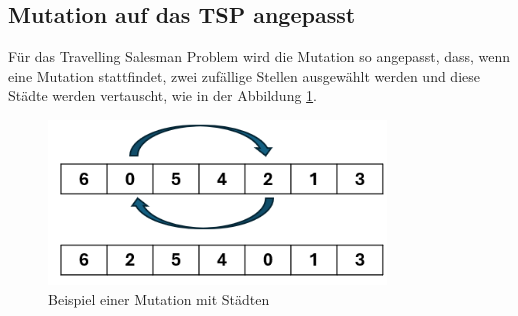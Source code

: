 \subsection{Mutation auf das TSP angepasst
\label{buch:paper:varalg:subsection:mutation_tsp}}
Für das Travelling Salesman Problem wird die Mutation so angepasst,
dass, wenn eine Mutation stattfindet, zwei zufällige Stellen ausgewählt
werden und diese Städte werden vertauscht, 
wie in der Abbildung \ref{fig:mutation_genetic_string_cities}.
\begin{figure}
	\centering
	\includegraphics[width=0.8\textwidth]{
        papers/varalg/images/teil3/09GeneticStringCitiesMutation.png
        }
	\caption{Beispiel einer Mutation mit Städten}
	\label{fig:mutation_genetic_string_cities}
\end{figure}
